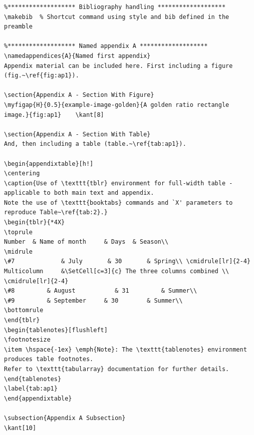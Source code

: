 \documentclass{article}
\begin{document}
{\begin{verbatim}
%******************* Bibliography handling *******************
\makebib  % Shortcut command using style and bib defined in the preamble

%******************* Named appendix A *******************
\namedappendices{A}{Named first appendix}
Appendix material can be included here. First including a figure (fig.~\ref{fig:ap1}).

\section{Appendix A - Section With Figure}
\myfigap{H}{0.5}{example-image-golden}{A golden ratio rectangle image.}{fig:ap1}	\kant[8]

\section{Appendix A - Section With Table}
And, then including a table (table.~\ref{tab:ap1}).

\begin{appendixtable}[h!]
\centering
\caption{Use of \texttt{tblr} environment for full-width table - applicable to both main text and appendix.  
Note the use of \texttt{booktabs} commands and `X' parameters to reproduce Table~\ref{tab:2}.}
\begin{tblr}{*4X}
\toprule
Number 	& Name of month 	& Days 	& Season\\
\midrule
\#7 			& July       & 30 		& Spring\\ \cmidrule[lr]{2-4}
Multicolumn 	&\SetCell[c=3]{c} The three columns combined \\ \cmidrule[lr]{2-4}
\#8 		& August 		   & 31 		& Summer\\
\#9 		& September 	& 30 		& Summer\\
\bottomrule
\end{tblr}
\begin{tablenotes}[flushleft]
\footnotesize
\item \hspace{-1ex} \emph{Note}: The \texttt{tablenotes} environment produces table footnotes.  
Refer to \texttt{tabularray} documentation for further details.  
\end{tablenotes}
\label{tab:ap1}
\end{appendixtable}

\subsection{Appendix A Subsection}
\kant[10]


\end{verbatim}}
\end{document}
